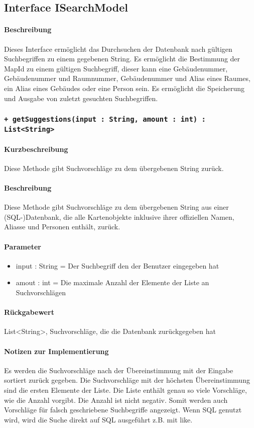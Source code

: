 \subsection{Interface ISearchModel}
\paragraph*{Beschreibung}
Dieses Interface ermöglicht das Durchsuchen der Datenbank nach gültigen Suchbegriffen zu einem gegebenen String.
Es ermöglicht die Bestimmung der MapId zu einem gültigen Suchbegriff, 
dieser kann eine Gebäudenummer, Gebäudenummer und Raumnummer, Gebäudenummer und Alias eines Raumes, ein Alias eines Gebäudes oder eine Person sein.
Es ermöglicht die Speicherung und Ausgabe von zuletzt gesuchten Suchbegriffen.

\subsubsection{\texttt{+ getSuggestions(input : String, amount : int) : List<String>}}%
\paragraph*{Kurzbeschreibung}
Diese Methode gibt Suchvorschläge zu dem übergebenen String zurück.
\paragraph*{Beschreibung}
Diese Methode gibt Suchvorschläge zu dem übergebenen String aus einer (SQL-)Datenbank, 
die alle Kartenobjekte inklusive ihrer offiziellen Namen, Aliasse und Personen enthält, zurück.
\paragraph*{Parameter}
\begin{itemize}
    \item input : String = Der Suchbegriff den der Benutzer eingegeben hat
    \item amout : int = Die maximale Anzahl der Elemente der Liste an Suchvorschlägen
\end{itemize}
\paragraph*{Rückgabewert}
List<String>, Suchvorschläge, die die Datenbank zurückgegeben hat
\paragraph*{Notizen zur Implementierung}
Es werden die Suchvorschläge nach der Übereinstimmung mit der Eingabe sortiert zurück gegeben.
Die Suchvorschläge mit der höchsten Übereinstimmung sind die ersten Elemente der Liste.
Die Liste enthält genau so viele Vorschläge, wie die Anzahl vorgibt. Die Anzahl ist nicht negativ.
Somit werden auch Vorschläge für falsch geschriebene Suchbegriffe angezeigt.
Wenn SQL genutzt wird, wird die Suche direkt auf SQL ausgeführt z.B. mit \dq like\dq{}.

